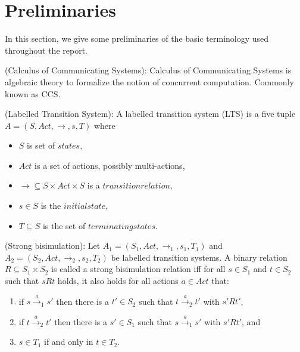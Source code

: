 \section{Preliminaries}

In this section, we give some preliminaries of the basic terminology used throughout the report.

\begin{definition}
(Calculus of Communicating Systems): Calculus of Communicating Systems is algebraic theory to formalize the notion of concurrent computation. Commonly known as CCS.
\end{definition}

\begin{definition}
(Labelled Transition System): A labelled transition system (LTS) is a five tuple $A=\left(S, Act, \rightarrow, s, T \right)$ where
\begin{itemize}
	\item $S$ is set of $states$,
	\item $Act$ is a set of actions, possibly multi-actions,
	\item $\rightarrow \subseteq S \times Act \times S$ is a $transition relation$,
	\item $s \in S$ is the $initial state$,
	\item $T \subseteq S$ is the set of $terminating states$.	
\end{itemize}
\end{definition}

\begin{definition}
(Strong bisimulation): Let $A_{1}=\left(S_{1}, Act, \rightarrow_{1}, s_{1}, T_{1}\right)$ and $A_{2}=\left(S_{2}, Act, \rightarrow_{2}, s_{2}, T_{2}\right)$ be labelled transition systems. A binary relation $R \subseteq S_{1} \times S_{2}$ is called a strong bisimulation relation iff for all $s \in S_{1}$ and $t \in S_{2}$ such that $sRt$ holds, it also holds for all actions $a \in Act$ that:
\begin{enumerate}
\item if $s\stackrel{a}{\rightarrow}_{1}s'$ then there is a $t' \in S_{2}$ such that $t\stackrel{a}{\rightarrow}_{2}t'$ with $s'Rt'$,
\item if $t\stackrel{a}{\rightarrow}_{2}t'$ then there is a $s' \in S_{1}$ such that $s\stackrel{a}{\rightarrow}_{1}s'$ with $s'Rt'$, and
\item $s \in T_{1}$ if and only in $t \in T_{2}$.
\end{enumerate}
\end{definition}

